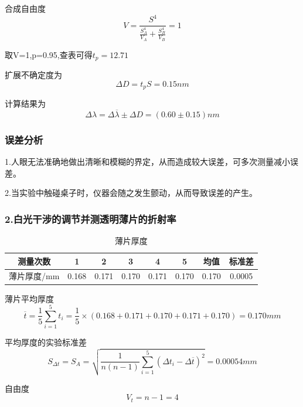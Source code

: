 \documentclass[12pt,a4paper,UTF8]{ctexart}
\begin{document}
合成自由度
\begin{equation*}
	V=\frac{S^4}{ \frac{S_A^4}{V_A}+ \frac{S_B^4}{V_B}}=1
\end{equation*}

取V=1,p=0.95,查表可得$t_p=12.71$

扩展不确定度为
\begin{equation*}
	\varDelta D=t_p S =0.15nm
\end{equation*}

计算结果为
\begin{equation*}
	\varDelta \lambda=\varDelta \overline{\lambda}\pm \varDelta D=(0.60\pm0.15)nm
\end{equation*}

\subsubsection*{误差分析}
1.人眼无法准确地做出清晰和模糊的界定，从而造成较大误差，可多次测量减小误差。

2.当实验中触碰桌子时，仪器会随之发生颤动，从而导致误差的产生。

\subsubsection*{2.白光干涉的调节并测透明薄片的折射率}

\begin{table}[htbp]
	\centering
	\caption{薄片厚度}
	\begin{tabular}{cccccccc}
	\toprule
    测量次数 & 1 & 2 & 3 & 4 & 5  & 均值 & 标准差\\
	\midrule
	薄片厚度/mm & 0.168 & 0.171 & 0.170 & 0.171 & 0.170 &0.170 &0.0005 \\
	\bottomrule
	\end{tabular}%
	\label{tab:device}%
\end{table}%

薄片平均厚度
\begin{equation*}
	\overline{t}= \frac{1}{5}\sum_{i = 1}^{5}  t_i=\frac{1}{5} \times (0.168 + 0.171 + 0.170 + 0.171 + 0.170 )=0.170mm
\end{equation*} 

平均厚度的实验标准差
\begin{equation*}
	S_{\varDelta t}=S_A=\sqrt{\frac{1}{n(n-1)}\sum_{i = 1}^{5}(\varDelta t_i-\varDelta \overline{t})^{2}} =0.00054mm
\end{equation*}

自由度
\begin{equation*}
	V_t=n-1=4
\end{equation*}
\end{document}
